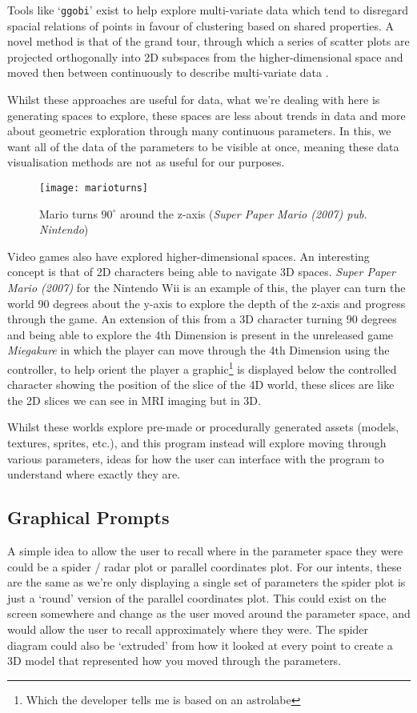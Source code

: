 Tools like `\verb|ggobi|' exist to help explore multi-variate data
\citep{swayne:dsc2003} which tend to disregard spacial relations of points in
favour of clustering based on shared properties. A novel method is that of the
grand tour, through which a series of scatter plots are projected orthogonally
into 2D subspaces from the higher-dimensional space and moved then between
continuously to describe multi-variate data \citep{asimov1985grand}.

Whilst these approaches are useful for data, what we're dealing with here is
generating spaces to explore, these spaces are less about trends in data and
more about geometric exploration through many continuous parameters. In this, we
want all of the data of the parameters to be visible at once, meaning these data
visualisation methods are not as useful for our purposes.

\begin{figure}[H]
    \centering
    \texttt{[image: marioturns]}
    \caption{Mario turns $90^\circ$ around the z-axis (\emph{Super Paper Mario
    (2007) pub. Nintendo})}
\end{figure}

Video games also have explored higher-dimensional spaces. An interesting concept
is that of 2D characters being able to navigate 3D spaces.  \emph{Super Paper
Mario (2007)} for the Nintendo Wii is an example of this, the player can turn
the world 90 degrees about the y-axis to explore the depth of the z-axis and
progress through the game. An extension of this from a 3D character turning 90
degrees and being able to explore the 4th Dimension is present in the unreleased
game \emph{Miegakure} in which the player can move through the 4th Dimension
using the controller, to help orient the player a graphic\footnote{Which the
developer tells me is based on an astrolabe} is displayed below the controlled
character showing the position of the slice of the 4D world, these slices are
like the 2D slices we can see in MRI imaging but in 3D.

Whilst these worlds explore pre-made or procedurally generated assets (models,
textures, sprites, etc.), and this program instead will explore moving through
various parameters, ideas for how the user can interface with the program to
understand where exactly they are.

\subsection{Graphical Prompts}
A simple idea to allow the user to recall where in the parameter space they were
could be a spider / radar plot or parallel coordinates plot. For our intents, these
are the same as we're only displaying a single set of parameters the spider plot
is just a `round' version of the parallel coordinates plot. This could exist on
the screen somewhere and change as the user moved around the parameter space,
and would allow the user to recall approximately where they were. The spider
diagram could also be `extruded' from how it looked at every point to create a
3D model that represented how you moved through the parameters.

